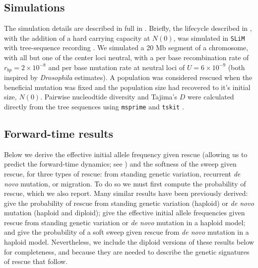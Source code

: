 \documentclass[]{article}
\begin{document}
\subsection*{Simulations}
\label{sec:simulations}

The simulation details are described in full in .
Briefly, the lifecycle described in , with the addition of a hard carrying capacity at $N(0)$, was simulated in \texttt{SLiM} \citep{Haller2019slim} with tree-sequence recording \citep{Haller2019tree}.
We simulated a 20 Mb segment of a chromosome, with all but one of the center loci neutral, with a per base recombination rate of $r_{bp}=2\times10^{-8}$ and per base mutation rate at neutral loci of $U=6\times10^{-9}$ (both inspired by \textit{Drosophila} estimates).
A population was considered rescued when the beneficial mutation was fixed and the population size had recovered to it's initial size, $N(0)$.
Pairwise nucleodtide diversity and Tajima's $D$ were calculated directly from the tree sequences using \texttt{msprime} \citep{kelleher2016efficient} and \texttt{tskit} \cite[][]{kelleher2018efficient}.

\subsection*{Forward-time results}
\label{sec:fwd_results}

Below we derive the effective initial allele frequency given rescue (allowing us to predict the forward-time dynamics; see ) and the softness of the sweep given rescue, for three types of rescue: from standing genetic variation, recurrent \textit{de novo} mutation, or migration.
To do so we must first compute the probability of rescue, which we also report.
Many similar results have been previously derived: \cite{orr2008population} give the probability of rescue from standing genetic variation (haploid) or \textit{de novo} mutation (haploid and diploid); \cite{orr2014population} give the effective initial allele frequencies given rescue from standing genetic variation or \textit{de novo} mutation in a haploid model; and \cite{wilson2017soft} give the probability of a soft sweep given rescue from \textit{de novo} mutation in a haploid model.
Nevertheless, we include the diploid versions of these results below for completeness, and because they are needed to describe the genetic signatures of rescue that follow.
\end{document}
